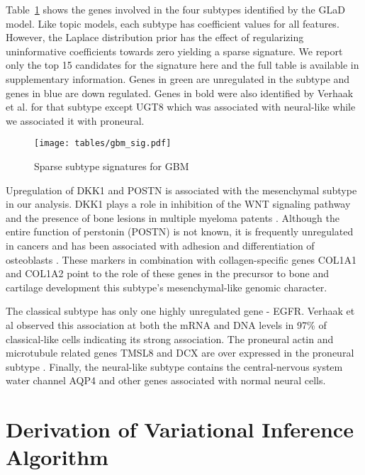 \documentclass[11pt]{amsart}
\begin{document}
Table~\ref{tbl:gbm_signature} shows the genes involved in the four subtypes identified by the GLaD model. Like topic models, each subtype has coefficient values for all features. However, the Laplace distribution prior has the effect of regularizing uninformative coefficients towards zero yielding a sparse signature. We report only the top 15 candidates for the signature here and the full table is available in supplementary information. Genes in green are unregulated in the subtype and genes in blue are down regulated. Genes in bold were also identified by Verhaak et al. for that subtype except UGT8 which was associated with neural-like while we associated it with proneural.

\begin{figure}[htbp]
\begin{center}
\texttt{[image: tables/gbm\_sig.pdf]}
\caption{Sparse subtype signatures for GBM}
\label{tbl:gbm_signature}
\end{center}
\end{figure}

Upregulation of DKK1 and POSTN is associated with the mesenchymal subtype in our analysis. DKK1 plays a role in inhibition of the WNT signaling pathway and the presence of bone lesions in multiple myeloma patents \cite{Tian:2003ht}. Although the entire function of perstonin (POSTN) is not known, it is frequently unregulated in cancers and has been associated with adhesion and differentiation of osteoblasts \cite{Kudo:2007we}. These markers in combination with collagen-specific genes COL1A1 and COL1A2 point to the role of these genes in the precursor to bone and cartilage development this subtype's mesenchymal-like genomic character.

The classical subtype has only one highly unregulated gene - EGFR. Verhaak et al observed this association at both the mRNA and DNA levels in 97\% of classical-like cells indicating its strong association\cite{Verhaak:2010bj}. The proneural actin and microtubule related genes TMSL8 and DCX are over expressed in the proneural subtype \cite{Brown:2003hc}. Finally, the neural-like subtype contains the central-nervous system water channel AQP4 and other genes associated with normal neural cells.

\appendix
\section{Derivation of Variational Inference Algorithm}\label{sec:varlap}
\end{document}
